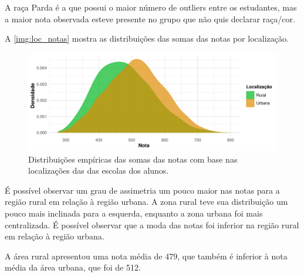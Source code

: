 A raça Parda é a que possui o maior número de outliers entre os estudantes,
mas a maior nota observada esteve presente no grupo que não quis declarar raça/cor.

\newpage
A \autoref{img:loc_notas} mostra as distribuições das somas das notas por localização.
\begin{figure}[htb]
    \caption{Distribuições empíricas das somas das notas com base nas localizações das
    das escolas dos alunos.\label{img:loc_notas}}
    \begin{center}
        \includegraphics[width=16cm]{img/loc_notas.pdf}
    \end{center}
\end{figure}

É possível observar um grau de assimetria um pouco maior nas notas para a região rural
em relação à região urbana. A zona rural teve sua distribuição um pouco mais inclinada
para a esquerda, enquanto a zona urbana foi mais centralizada. É possível observar que
a moda das notas foi inferior na região rural em relação à região urbana.

A área rural apresentou uma nota média de 479, que também é inferior à nota média da
área urbana, que foi de 512.

